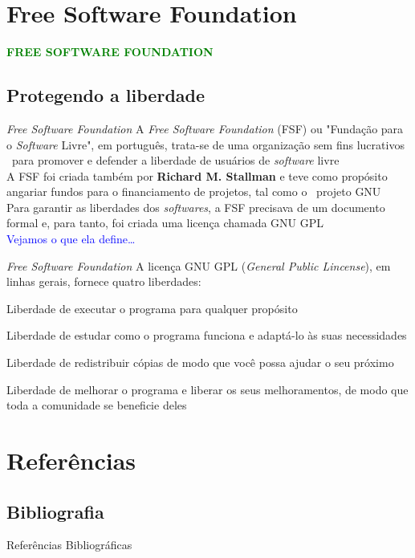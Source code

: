 \documentclass{beamer}
\begin{document}
\section{Free Software Foundation}
  \begin{frame}
     \begin{center}
        \Large{\textcolor{green}{\textbf{FREE SOFTWARE FOUNDATION}}}
     \end{center}
   \end{frame}
  \subsection{Protegendo a liberdade}
    \begin{frame}[t]{\textit{Free Software Foundation}}
      {A \textit{Free Software Foundation} (FSF) ou "Fundação para o \textit{Software} Livre", em português, trata-se de uma organização sem fins lucrativos \
      para promover e defender a liberdade de usuários de \textit{software} livre \\}
      \vspace{\baselineskip}
      \uncover<3->
      {A FSF foi criada também por \textbf{Richard M. Stallman} e teve como propósito angariar fundos para o financiamento de projetos, tal como o \
      projeto GNU \\}
      \vspace{\baselineskip}
      \uncover<4->
      {Para garantir as liberdades dos \textit{softwares}, a FSF precisava de um documento formal e, para tanto, foi criada uma licença chamada GNU GPL \\}
      \vspace{\baselineskip}
      \uncover<5->
      {\textcolor{blue}{Vejamos o que ela define\dots}}
   \end{frame}

    \begin{frame}[t]{\textit{Free Software Foundation}}
      A licença GNU GPL (\textit{General Public Lincense}), em linhas gerais, fornece quatro liberdades:
      \begin{enumerate}
	\vspace{\baselineskip}
	\uncover<2->
	{\item Liberdade de executar o programa para qualquer propósito}
	{\item Liberdade de estudar como o programa funciona e adaptá-lo às suas necessidades}
	{\item Liberdade de redistribuir cópias de modo que você possa ajudar o seu próximo}
	{\item Liberdade de melhorar o programa e liberar os seus melhoramentos, de modo que toda a comunidade se beneficie deles}
      \end{enumerate}
   \end{frame}

\section{Referências}
  \subsection{Bibliografia}
  \begin{frame}[t]{Referências Bibliográficas}
    
    
  \end{frame}
\end{document}
